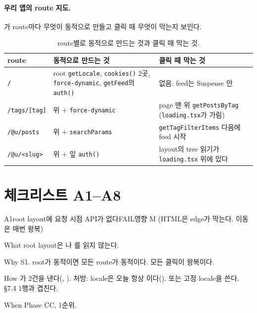\paragraph{우리 앱의 route 지도.}
가 route마다 무엇이 동적으로 만들고 클릭 때 무엇이 막는지 보인다.

\begin{table}[H]
  \caption{route별로 동적으로 만드는 것과 클릭 때 막는 것.}
  \label{tab:dy-routes}
  \centering\footnotesize
  \begin{tabularx}{\linewidth}{@{}L{2.4cm} Y Y@{}}
    \toprule
    route & 동적으로 만드는 것 & 클릭 때 막는 것 \\
    \midrule
    \texttt{/} & root \texttt{getLocale}, \texttt{cookies()} 2곳, \texttt{force-dynamic}, \texttt{getFeed}의 \texttt{auth()} & 없음. feed는 Suspense 안 \\
    \midrule
    \texttt{/tags/[tag]} & 위 + \texttt{force-dynamic} & page 맨 위 \texttt{getPostsByTag} (\texttt{loading.tsx}가 가림) \\
    \midrule
    \texttt{/@u/posts} & 위 + \texttt{searchParams} & \texttt{getTagFilterItems} 다음에 feed 시작 \\
    \midrule
    \texttt{/@u/<slug>} & 위 + 잎 \texttt{auth()} & layout의 tree 읽기가 \texttt{loading.tsx} 위에 있다 \\
    \bottomrule
  \end{tabularx}
\end{table}

\section{체크리스트 A1--A8}\label{sec:dy-checklist}

\begin{checkitem}{\ckopen}{A1}{root layout에 요청 시점 API가 없다}{FAIL\ckdot{}영향 M (HTML은 edge가 막는다. 이동은 매번 왕복)}
  \item[What] root layout은 나 를 읽지 않는다.
  \item[Why] S1. root가 동적이면 모든 route가 동적이다. 모든 클릭이 왕복이다.
  \item[How] 가 2건을 낸다(, ). 처방: locale은 오늘 항상 이다().  또는 고정 locale을 쓴다.  \S7.4 1행과 겹친다.
  \item[When] Phase CC, 1순위.
\end{checkitem}


